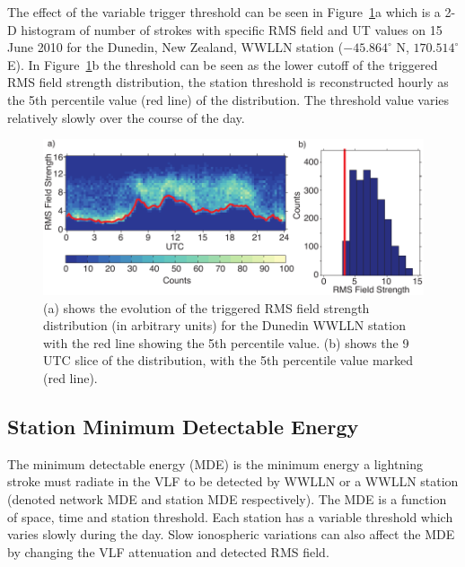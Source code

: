 The effect of the variable trigger threshold can be seen in Figure~\ref{efficiency:fig:Threshold}a which is a 2-D histogram of number of strokes with specific RMS field and UT values on 15 June 2010 for the Dunedin, New Zealand, WWLLN station ($-45.864^\circ$ N, $170.514^\circ$ E).
In Figure~\ref{efficiency:fig:Threshold}b the threshold can be seen as the lower cutoff of the triggered RMS field strength distribution, the station threshold is reconstructed hourly as the 5th percentile value (red line) of the distribution.
The threshold value varies relatively slowly over the course of the day.


\begin{figure}[ht!]
   \centering
\noindent\includegraphics[scale=1]{efficiency/Figures/2012RS005049-p2.pdf}
   \caption{(a) shows the evolution of the triggered RMS field strength distribution (in arbitrary units) for the Dunedin WWLLN station with the red line showing the 5th percentile value.
(b) shows the 9 UTC slice of the distribution, with the 5th percentile value marked (red line).}
   \label{efficiency:fig:Threshold}
\end{figure}

\subsection{Station Minimum Detectable Energy}

The minimum detectable energy (MDE) is the minimum energy a lightning stroke must radiate in the VLF to be detected by WWLLN or a WWLLN station (denoted network MDE and station MDE respectively).
The MDE is a function of space, time and station threshold.
Each station has a variable threshold which varies slowly during the day.
Slow ionospheric variations can also affect the MDE by changing the VLF attenuation and detected RMS field.


